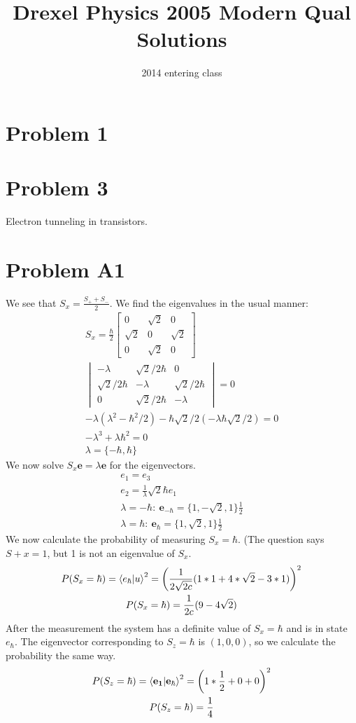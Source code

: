 \documentclass[a4paper,11pt]{article}
\title{Drexel Physics 2005 Modern Qual Solutions}
\author{2014 entering class}
\numberwithin{equation}{section}
\newcommand{\bv}[1]{\mathbf{#1}}
\begin{document}
\maketitle

\section{Problem 1}
\section{Problem 3}
Electron tunneling in transistors.
\section{Problem A1}
We see that $S_x=\frac{S_+ + S_-}{2}$.
We find the eigenvalues in the usual manner:
\begin{gather}
 S_x = \frac{\hbar}{2}
 \begin{bmatrix}
  0 & \sqrt{2} & 0 \\
  \sqrt{2} & 0 & \sqrt{2} \\
  0 & \sqrt{2} & 0
 \end{bmatrix} \\
 \begin{vmatrix}
  -\lambda & \sqrt{2}/2 \hbar & 0 \\
  \sqrt{2}/2 \hbar & -\lambda & \sqrt{2}/2 \hbar \\
  0 & \sqrt{2}/2 \hbar & -\lambda
 \end{vmatrix} = 0\\
 -\lambda(\lambda^2-\hbar^2/2)-\hbar\sqrt{2}/2(-\lambda\hbar\sqrt{2}/2)=0\\
 -\lambda^3+\lambda \hbar^2=0\\
 \lambda = \{-\hbar, \hbar \}
\end{gather}
We now solve $S_x \bv{e} = \lambda \bv{e}$ for the eigenvectors.\\
\begin{gather}
 e_1=e_3\\
 e_2=\frac{1}{\lambda}\sqrt{2} \hbar e_1\\
 \lambda=-\hbar:\ \bv{e_{-\hbar}}=\{1,-\sqrt{2},1 \}\frac{1}{2}\\
 \lambda=\hbar:\ \bv{e_{\hbar}}=\{1,\sqrt{2},1 \}\frac{1}{2}
\end{gather}
We now  calculate the probability of measuring $S_x=\hbar$.
(The question says $S+x=1$, but 1 is not an eigenvalue of $S_x$.
\begin{gather}
 P(S_x=\hbar) = \braket{e_\hbar|u}^2= \left(\frac{1}{2\sqrt{2c}}(1*1+4*\sqrt{2}-3*1 )\right)^2\\
 P(S_x=\hbar) = \frac{1}{2c}(9-4\sqrt{2})
\end{gather}
After the measurement the system has a definite value of $S_x=\hbar$ and is in state $e_\hbar$.
The eigenvector corresponding to $S_z=\hbar$ is $(1,0,0)$, so we calculate the probability the same way.
\begin{gather}
 P(S_z=\hbar) = \braket{\bv{e_1}|\bv{e_\hbar}}^2= \left( 1*\frac{1}{2}+0+0 \right)^2\\
 P(S_z=\hbar) = \frac{1}{4}
\end{gather}
\\
\end{document}
